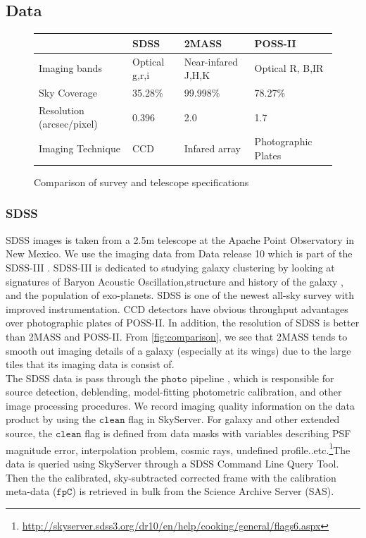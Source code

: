 \documentclass[5p]{elsarticle}
\begin{document}
\subsection{Data}
\begin{figure}[!hbt]
\center
    \begin{tabular}{|l|l|l|l|}
    \hline
    ~                         & SDSS          & 2MASS              & POSS-II             \\ \hline
    Imaging bands             & Optical g,r,i & Near-infared J,H,K & Optical R, B,IR     \\ \hline
    Sky Coverage              & 35.28\%       & 99.998\%           & 78.27\%              \\ \hline
    Resolution (arcsec/pixel) & 0.396         & 2.0                & 1.7                 \\ \hline
    Imaging Technique         & CCD           & Infared array      & Photographic Plates \\ \hline
    
    \end{tabular}
    \label{table:comptbl}
\caption{Comparison of survey and telescope specifications }
\end{figure}
	\subsubsection{SDSS}
	SDSS images is taken from a 2.5m telescope at the Apache Point Observatory in New Mexico. We use the imaging data from Data release 10 which is part of the SDSS-III . SDSS-III is dedicated to studying galaxy clustering by looking at signatures of Baryon Acoustic Oscillation,structure and history of the galaxy , and the population of exo-planets.  SDSS is  one of the newest all-sky survey with improved instrumentation. CCD detectors have obvious throughput advantages over photographic plates of POSS-II. In addition, the resolution of SDSS is better than 2MASS and POSS-II.  From \autoref{fig:comparison}, we see that 2MASS tends to smooth out imaging details of a galaxy (especially at its wings)  due to the large tiles that its imaging data is consist of.
\\
\indent The SDSS data is pass through the $\texttt{photo}$ pipeline  , which is responsible for source detection, deblending, model-fitting photometric calibration, and other image processing procedures. We record imaging quality information on the data product by using the $\texttt{clean}$ flag in SkyServer. For galaxy and other extended source, the $\texttt{clean}$ flag is defined from data masks with variables describing PSF magnitude error,  interpolation problem,  cosmic rays, undefined profile..etc.\footnote{\url{http://skyserver.sdss3.org/dr10/en/help/cooking/general/flags6.aspx}}The data is queried using SkyServer through a SDSS Command Line Query Tool. Then the the calibrated, sky-subtracted corrected frame with the calibration meta-data ($\texttt{fpC}$) is retrieved in bulk from the Science Archive Server (SAS). 
\end{document}
